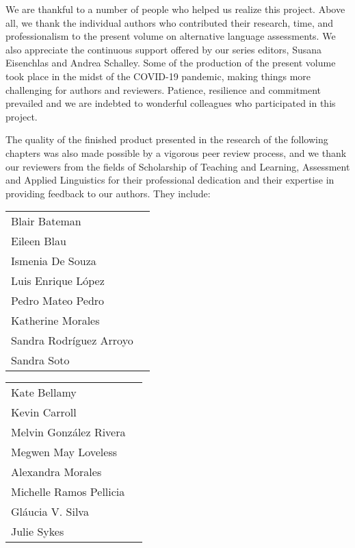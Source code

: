 
\begin{sloppypar}
We are thankful to a number of people who helped us realize this project. Above all, we thank the individual authors who contributed their research, time, and professionalism to the present volume on alternative language assessments. We also appreciate the continuous support offered by our series editors, Susana Eisenchlas and Andrea Schalley.  Some of the production of the present volume took place in the midst of the COVID-19 pandemic, making things more challenging for authors and reviewers. Patience, resilience and commitment prevailed and we are indebted to wonderful colleagues who participated in this project.
\end{sloppypar}

The quality of the finished product presented in the research of the following chapters was also made possible by a vigorous peer review process, and we thank our reviewers from the fields of Scholarship of Teaching and Learning, Assessment and Applied Linguistics for their professional dedication and their expertise in providing feedback to our authors. They include:\medskip



\begin{tabularx}{.45\textwidth}{lQ}
Blair Bateman\\
Eileen Blau\\
Ismenia De Souza\\
Luis Enrique López\\
Pedro Mateo Pedro\\
Katherine Morales\\
Sandra Rodríguez Arroyo\\
Sandra Soto\\
\end{tabularx}
\begin{tabularx}{.45\textwidth}{lQ}
Kate Bellamy\\
Kevin Carroll\\
Melvin González Rivera\\
Megwen May Loveless\\
Alexandra Morales\\
Michelle Ramos Pellicia\\
Gláucia V. Silva\\
Julie Sykes\\
\end{tabularx}
